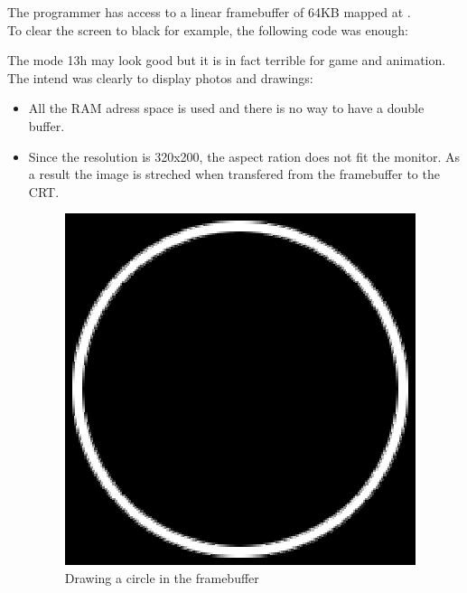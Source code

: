\documentclass[book.tex]{subfiles}
\begin{document}
  The programmer has access to a linear framebuffer of 64KB mapped at .\\
  
  To clear the screen to black for example, the following code was enough:\\
  
  \begin{minipage}{\textwidth}
  
  \end{minipage}
  
  The mode 13h may look good but it is in fact terrible for game and animation. The intend was clearly to display photos and drawings:
  \begin{itemize}
\item All the RAM adress space is used and there is no way to have a double buffer.
\item Since the resolution is 320x200, the aspect ration does not fit the monitor. As a result the image is streched when transfered from the 
framebuffer to the CRT.

 \begin{figure}[H]
\centering
\includegraphics[width=\textwidth]{imgs/circleframebuffer.eps}
%
\caption{Drawing a circle in the framebuffer}
\end{figure}


\end{itemize}
\end{document}
